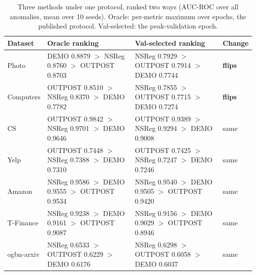 \begin{table}[t]
\centering
\small
\begin{tabular}{llll}
\toprule
Dataset & Oracle ranking & Val-selected ranking & Change \\
\midrule
Photo & DEMO 0.8879 $>$ NSReg 0.8760 $>$ OUTPOST 0.8703 & NSReg 0.7929 $>$ OUTPOST 0.7914 $>$ DEMO 0.7744 & \textbf{flips} \\
Computers & OUTPOST 0.8510 $>$ NSReg 0.8370 $>$ DEMO 0.7782 & NSReg 0.7855 $>$ OUTPOST 0.7715 $>$ DEMO 0.7274 & \textbf{flips} \\
CS & OUTPOST 0.9842 $>$ NSReg 0.9701 $>$ DEMO 0.9646 & OUTPOST 0.9389 $>$ NSReg 0.9294 $>$ DEMO 0.9008 & same \\
Yelp & OUTPOST 0.7448 $>$ NSReg 0.7388 $>$ DEMO 0.7310 & OUTPOST 0.7425 $>$ NSReg 0.7247 $>$ DEMO 0.7246 & same \\
Amazon & NSReg 0.9586 $>$ DEMO 0.9555 $>$ OUTPOST 0.9534 & NSReg 0.9540 $>$ DEMO 0.9505 $>$ OUTPOST 0.9420 & same \\
T-Finance & NSReg 0.9238 $>$ DEMO 0.9161 $>$ OUTPOST 0.9087 & NSReg 0.9156 $>$ DEMO 0.9029 $>$ OUTPOST 0.8946 & same \\
ogbn-arxiv & NSReg 0.6533 $>$ OUTPOST 0.6229 $>$ DEMO 0.6176 & NSReg 0.6298 $>$ OUTPOST 0.6058 $>$ DEMO 0.6037 & same \\
\bottomrule
\end{tabular}
\caption{Three methods under one protocol, ranked two ways (AUC-ROC over all anomalies, mean over 10 seeds). Oracle: per-metric maximum over epochs, the published protocol. Val-selected: the peak-validation epoch.}
\label{tab:three_method}
\end{table}
